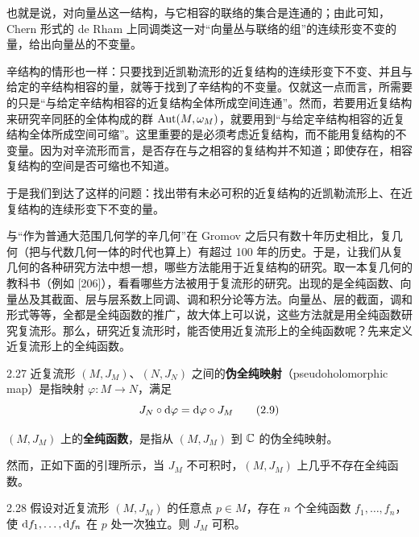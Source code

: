也就是说，对向量丛这一结构，与它相容的联络的集合是连通的；由此可知，Chern 形式的 de Rham 上同调类这一对“向量丛与联络的组”的连续形变不变的量，给出向量丛的不变量。

辛结构的情形也一样：只要找到近凯勒流形的近复结构的连续形变下不变、并且与给定的辛结构相容的量，就等于找到了辛结构的不变量。仅就这一点而言，所需要的只是“与给定辛结构相容的近复结构全体所成空间连通”。然而，若要用近复结构来研究辛同胚的全体构成的群 $\operatorname{Aut}(M,\omega_M)$，就要用到“与给定辛结构相容的近复结构全体所成空间可缩”。这里重要的是必须考虑近复结构，而不能用复结构的不变量。因为对辛流形而言，是否存在与之相容的复结构并不知道；即使存在，相容复结构的空间是否可缩也不知道。

于是我们到达了这样的问题：找出带有未必可积的近复结构的近凯勒流形上、在近复结构的连续形变下不变的量。

与“作为普通大范围几何学的辛几何”在 Gromov 之后只有数十年历史相比，复几何（把与代数几何一体的时代也算上）有超过 100 年的历史。于是，让我们从复几何的各种研究方法中想一想，哪些方法能用于近复结构的研究。取一本复几何的教科书（例如 [206]），看看哪些方法被用于复流形的研究。出现的是全纯函数、向量丛及其截面、层与层系数上同调、调和积分论等方法。向量丛、层的截面，调和形式等等，全都是全纯函数的推广，故大体上可以说，这些方法就是用全纯函数研究复流形。那么，研究近复流形时，能否使用近复流形上的全纯函数呢？先来定义近复流形上的全纯函数。

\begin{definition}{2.27}
  近复流形 $(M,J_M)$、$(N,J_N)$ 之间的\textbf{伪全纯映射}（pseudoholomorphic map）是指映射 $\varphi\colon M\to N$，满足
  \begin{equation}
    J_N\circ\mathrm{d}\varphi=\mathrm{d}\varphi\circ J_M \tag{2.9}
  \end{equation}
\end{definition}

$(M,J_M)$ 上的\textbf{全纯函数}，是指从 $(M,J_M)$ 到 $\mathbb{C}$ 的伪全纯映射。

然而，正如下面的引理所示，当 $J_M$ 不可积时，$(M,J_M)$ 上几乎不存在全纯函数。

\begin{lemma}{2.28}
  假设对近复流形 $(M,J_M)$ 的任意点 $p\in M$，存在 $n$ 个全纯函数 $f_1,\dots,f_n$，使 $\mathrm{d} f_1,\dots,\mathrm{d} f_n$ 在 $p$ 处一次独立。则 $J_M$ 可积。
\end{lemma}

